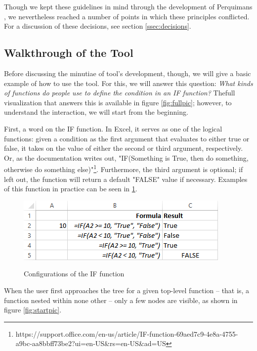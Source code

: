 \documentclass[conference]{IEEEtran}
\newcommand{\toolname}{Perquimans }
\begin{document}
	Though we kept these guidelines in mind through the development of \toolname,
	we nevertheless reached a number of points in which these principles
	conflicted. For a discussion of these decisions, see section
	\ref{ssec:decisions}.
	
	\subsection{Walkthrough of the Tool} \label{sec:walkthrough}Before discussing
	the minutiae of tool's development, though, we will give a basic example of how
	to use the tool. For this, we will answer this question: \textit{ What kinds of
		functions do people use to define the condition in an IF function?} Thefull
	visualization that answers this is available in figure \ref{fig:fullpic};
	however, to understand the interaction, we will start from the beginning. \par
	
	First, a word on the IF function. In Excel, it serves as one of the logical
	functions: given a condition as the first argument that evaluates to either
	true or false, it takes on the value of either the second or third argument,
	respectively. Or, as the documentation writes out, "IF(Something is True, then
	do something, otherwise do something
	else)"\footnote{https://support.office.com/en-us/article/IF-function-69aed7c9-4e8a-4755-a9bc-aa8bbff73be2?ui=en-US\&rs=en-US\&ad=US}. Furthermore, the third argument is optional; if left out, the function will return a default "FALSE" value if necessary. Examples of this function in practice can be seen in \ref{fig:ifexample}.
	
	\begin{figure}[h] \centering \includegraphics[width=.5\textwidth]{ifExample}
		\label{fig:ifexample} \caption{Configurations of the IF function} \end{figure}
	
	When the user first approaches the tree for a given top-level function -- that
	is, a function nested within none other -- only a few nodes are visible, as
	shown in figure \ref{fig:startpic}. \par
	
\end{document}
